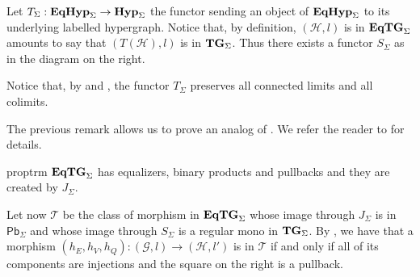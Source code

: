 \documentclass[3p]{elsarticle}
\newcommand{\pbc}{\mathsf{Pb}}
\newcommand{\catname}[1]{\textbf{\textup{#1}}}
\newcommand{\hyp}{\catname{Hyp}}
\newcommand{\EqHyp}{\catname{EqHyp}} %
\newcommand{\EqTG}{\catname{EqTG}}
\newcommand{\tg}[0]{\catname{TG}_{\Sigma}}
\theoremstyle{remark}
\theoremstyle{definition}
\begin{document}
\noindent 
\begin{minipage}[l]{.72\linewidth}
	\begin{rem}\label{rem:obv}
		Let $T_\Sigma:  \EqHyp_{\Sigma} \to \hyp_{\Sigma}$ the functor sending an object of $\EqHyp_{\Sigma}$ to its underlying  labelled hypergraph.
		Notice that, by definition, $(\mathcal{H}, l)$ is in $\EqTG_{\Sigma}$ amounts to say that $(T(\mathcal{H}), l)$ is in $\tg$. 
		Thus there exists a functor $S_\Sigma$ as in the diagram on the right.
	\end{rem}
\end{minipage}
\hfill 
\begin{minipage}[r]{.23\linewidth}
	\xymatrix{\EqTG_{\Sigma} \ar[r]^{J_\Sigma}  \ar[d]_{S_\Sigma}& \EqHyp_\Sigma \ar[d]^{T_\Sigma} \\ \tg \ar[r]^{I_\Sigma}& \hyp_{\Sigma}}
\end{minipage}

\begin{rem}\label{rem:t}
	Notice that, by  and , the functor $T_\Sigma$ preserves all connected limits and all colimits.
\end{rem}

 The previous remark allows us to prove an analog of . We refer the reader to  for details.
 
 \begin{restatable}{prop}{trm}\label{prop:term}
$\EqTG_{\Sigma}$ has equalizers, binary products and pullbacks and they are created by $J_\Sigma$.
 \end{restatable}
 
\noindent
\begin{minipage}[l]{.8\linewidth}
	Let now $\mathcal{T}$ be the class of morphism in $\EqTG_{\Sigma}$ whose image through $J_\Sigma$ is in $\pbc_\Sigma$ and whose image through $S_\Sigma$ is a regular mono in $\tg$.  By , we have that a morphism $(h_E, h_V, h_Q)\colon (\mathcal{G},l)\to (\mathcal{H}, l')$ is in $\mathcal{T}$ if and only if all of its components are injections and the square on the right is a pullback.
\end{minipage} \hfill 
\begin{minipage}[r]{.18\linewidth}
\end{minipage} 
\end{document}
